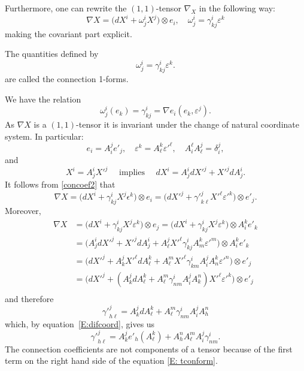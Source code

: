 Furthermore, one can rewrite the $(1,1)$-tensor $\nabla_X$ in the following way:
\begin{equation}\label{concoef2}
\nabla X 
=\big(dX^{i} +\omega^{i}_{j} X^{j}\big) \otimes e_{i},\quad  \omega^{i}_{j}=\gamma^{i}_{kj} \varepsilon^{k}
\end{equation}
making the covariant part explicit.
\begin{definition}
The quantities defined by 
\begin{equation}\label{E:conform}
\omega^{i}_{j}=\gamma^{i}_{kj} \varepsilon^{k} .
\end{equation}
are called the connection 1-forms.
\end{definition}
We have the relation
\begin{equation}
\omega^{i}_{j}(e_{k})=\gamma^{i}_{kj} =
\nabla e_{i}(e_{k},\varepsilon^{j}).
\end{equation}
As $\nabla X$ is a $(1,1)$-tensor it is invariant under the change of natural coordinate system. In particular:
\[e_{i}= A_{i}^{j}e'_{j},\quad {\varepsilon}^{k}=  A_{\ell}^{k} {\varepsilon'}^{\ell},\quad  A^{\ell}_{i}A_{\ell}^{j}=\delta _{i}^{j},\]
and \[ X^{i}=A^{i}_{j}{X'}^{j}\quad  \text{ implies }\quad   dX^{i}=A^{i}_{j}d{X'}^{j}+{X'}^{j}dA^{i}_{j}.\]
It follows from \eqref{concoef2} that
\[\nabla X=\big(dX^{i} +\gamma^{i}_{kj} X^{j}\epsilon^{k}\big) \otimes e_{i}=\big(d{X'}^{j} +{\gamma'}^{j}_{k\ell} {X'}^{\ell}{\varepsilon'}^{k}\big) \otimes e'_{j}.\]
Moreover,
\[\begin{aligned}
\nabla X&=\big(dX^{i} +\gamma^{i}_{kj} X^{j}\varepsilon^{k}\big) \otimes e_{j}=\big(dX^{i} +\gamma^{i}_{kj} X^{j}\varepsilon^{k}\big) \otimes A^{k}_{i}e'_{k}\\
&=\big(A^{i}_{j}d{X'}^{j}+ {X'}^{j}dA_{j}^{i}+A^{j}_{\ell}{X'}^{\ell}{\gamma}^{i}_{kj}A^{k}_{m} {\varepsilon'}^{m}\big) \otimes A^{k}_{i}e'_{k}\\
&=\big(d{X'}^{j}+ A^{j}_{k}{X'}^{\ell}dA_{\ell}^{k}+A^{m}_{\ell}{X'}^{\ell}{\gamma}^{i}_{km}A^{j}_{i}A^{k}_{n} {\varepsilon'}^{n}\big) \otimes e'_{j}\\
&=\big(d{X'}^{j}+ (A^{j}_{k}dA_{\ell}^{k}+A^{m}_{\ell}{\gamma}^{i}_{nm}
A^{j}_{i}A^{n}_{k} ){X'}^{\ell}{\varepsilon'}^{k}\big) \otimes e'_{j}\\
\end{aligned}\]
and therefore
\[
{\gamma'}^{j}_{h\ell}=A^{j}_{k}dA_{\ell}^{k}+A^{m}_{\ell}{\gamma}^{i}_{nm}
A^{j}_{i}A^{n}_{h}
\]
which, by equation~\eqref{E:difcoord}, gives us
\begin{equation}\label{E: tconform}
{\gamma'}^{j}_{h\ell}=A^{j}_{k}e'_{h}(A_{\ell}^{k})+A^{n}_{h}A^{m}_{\ell}A^{j}_{i}{\gamma}^{i}_{nm}.
\end{equation}
The connection coefficients are not components of a tensor because of the first term on the right hand side of the equation \eqref{E: tconform}.
\vspace{5pt}

